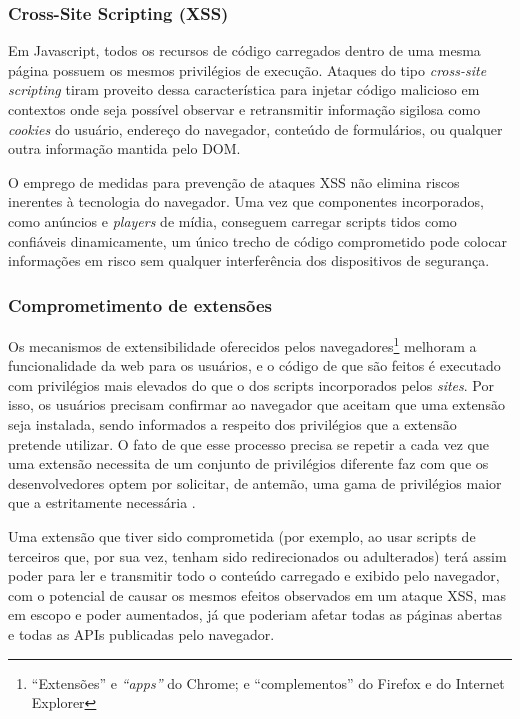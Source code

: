 \subsubsection{Cross-Site Scripting (XSS)}
Em Javascript, todos os recursos de código carregados dentro de uma mesma página possuem os mesmos privilégios de execução. Ataques do tipo \textit{cross-site scripting} tiram proveito dessa característica para injetar código malicioso em contextos onde seja possível observar e retransmitir informação sigilosa como \textit{cookies} do usuário, endereço do navegador, conteúdo de formulários, ou qualquer outra informação mantida pelo DOM.

O emprego de medidas para prevenção de ataques XSS \cite{OWASP:XSS-CheatSheet} não elimina riscos inerentes à tecnologia do navegador. Uma vez que componentes incorporados, como anúncios e \textit{players} de mídia, conseguem carregar scripts tidos como confiáveis dinamicamente, um único trecho de código comprometido pode colocar informações em risco sem qualquer interferência dos dispositivos de segurança.

\subsubsection{Comprometimento de extensões}

Os mecanismos de extensibilidade oferecidos pelos navegadores\footnote{``Extensões'' e \textit{``apps''} do Chrome; e ``complementos'' do Firefox e do Internet Explorer} melhoram a funcionalidade da web para os usuários, e o código de que são feitos é executado com privilégios mais elevados do que o dos scripts incorporados pelos \textit{sites}. Por isso, os usuários precisam confirmar ao navegador que aceitam que uma extensão seja instalada, sendo informados a respeito dos privilégios que a extensão pretende utilizar. O fato de que esse processo precisa se repetir a cada vez que uma extensão necessita de um conjunto de privilégios diferente faz com que os desenvolvedores optem por solicitar, de antemão, uma gama de privilégios maior que a estritamente necessária \cite{Heule2015}.

Uma extensão que tiver sido comprometida (por exemplo, ao usar scripts de terceiros que, por sua vez, tenham sido redirecionados ou adulterados) terá assim poder para ler e transmitir todo o conteúdo carregado e exibido pelo navegador, com o potencial de causar os mesmos efeitos observados em um ataque XSS, mas em escopo e poder aumentados, já que poderiam afetar todas as páginas abertas e todas as APIs publicadas pelo navegador.

